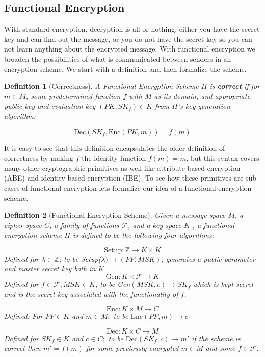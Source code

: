 \documentclass[12pt,twoside]{reedthesis}
\newtheorem{definition}{Definition}
\newcommand{\enc}[0]{\text{Enc}}
\newcommand{\dec}[0]{\text{Dec}}
\newcommand{\Z}[0]{\mathbb{Z}}
\begin{document}
\subsection{Functional Encryption}

With standard encryption, decryption is all or nothing, either you have the secret key and can find out the message, or you do not have the secret key so you can not learn anything about the encrypted message. With functional encryption we broaden the possibilities of what is communicated between senders in an encryption scheme. We start with a definition and then formalize the scheme.
\begin{definition}[Correctness]
A Functional Encryption Scheme $\Pi$ is \textbf{correct} if for $m \in M$, some predetermined function $f$ with $M$ as its domain, and appropriate public key and \textit{evaluation} key $(PK,SK_f)\in K$ from $\Pi$'s key generation algorithm:

$$\dec(SK_f, \enc(PK,m)) = f(m) $$
\end{definition}

It is easy to see that this definition encapsulates the older definition of correctness by making $f$ the identity function $f(m) = m$, but this syntax covers many other cryptographic primitives as well like attribute based encryption (ABE) and identity based encryption (IBE). To see how these primitives are sub cases of functional encryption lets formalize our idea of a functional encryption scheme. 




\begin{definition}[Functional Encryption Scheme]
Given a message space $M$, a cipher space $C$, a family of functions $\mathcal{F}$, and a key space $K$ , a functional encryption scheme $\Pi$ is defined to be the following four algorithms:

$$\text{Setup}: \Z \rightarrow K \times K$$
Defined for $\lambda \in \Z$; to be Setup($\lambda) \rightarrow (PP,MSK)$, generates a public parameter and master secret key both in $K$
$$\text{Gen}: K \times \mathcal{F} \rightarrow K $$
Defined for $f \in \mathcal{F}, MSK \in K$; to be Gen$(MSK,c) \rightarrow SK_f$ which is kept secret and is the secret key associated with the functionality of $f$.

$$\enc: K \times M \rightarrow C$$
Defined: For $PP\in K$ and $m \in M;$ to be $\enc(PP,m) \rightarrow c$

$$\dec:K \times C \rightarrow M$$
Defined for $SK_f \in K$ and $c \in C;$ to be $\dec(SK_f,c) \rightarrow m'$ if the scheme is correct then $m' = f(m)$ for some previously encrypted $m\in M$ and some $f\in \mathcal{F}$.

\end{definition}
\end{document}

